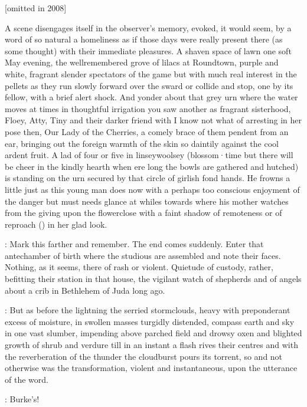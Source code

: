 [omitted in 2008]

A scene disengages
itself in the observer's memory,
evoked,
it would seem,
by a word of so
natural a homeliness as if those days were really present there
(as some thought)
with their immediate pleasures.
A shaven space of lawn one soft
May evening,
the wellremembered grove of lilacs at Roundtown,
purple and
white,
fragrant slender spectators of the game but with much real
interest in the pellets as they run slowly forward over the sward or
collide and stop,
one by its fellow,
with a brief alert shock.
And yonder
about that grey urn where the water moves at times in thoughtful
irrigation you saw another as fragrant sisterhood,
Floey,
Atty,
Tiny and
their darker friend with I know not what of arresting in her pose then,
Our Lady of the Cherries,
a comely brace of them pendent from an ear,
bringing out the foreign warmth of the skin so daintily against the cool
ardent fruit.
A lad of four or five in linseywoolsey
(blossom·time but there will be cheer in the kindly hearth when ere long the bowls are gathered and hutched)
is standing on the urn secured by that circle of girlish fond hands.
He frowns a little just as this young man does now
with a perhaps too conscious enjoyment of the danger but must needs
glance at whiles towards where his mother watches
from the  giving upon the flowerclose
with a faint shadow of remoteness or of reproach
() in her glad look.


:
Mark this farther and remember.
The end comes suddenly.
Enter that
antechamber of birth where the studious are assembled and note their
faces.
Nothing,
as it seems,
there of rash or violent.
Quietude of
custody,
rather,
befitting their station in that house,
the vigilant
watch of shepherds and of angels about a crib in Bethlehem of Juda long
ago.

:
But as before the lightning the serried stormclouds,
heavy with
preponderant excess of moisture,
in swollen masses turgidly distended,
compass earth and sky in one vast slumber,
impending above parched field
and drowsy oxen and blighted growth of shrub and verdure till in an
instant a flash rives their centres and with the reverberation of the
thunder the cloudburst pours its torrent,
so and not otherwise was the
transformation,
violent and instantaneous,
upon the utterance of the
word.


\stephen:
Burke's!

